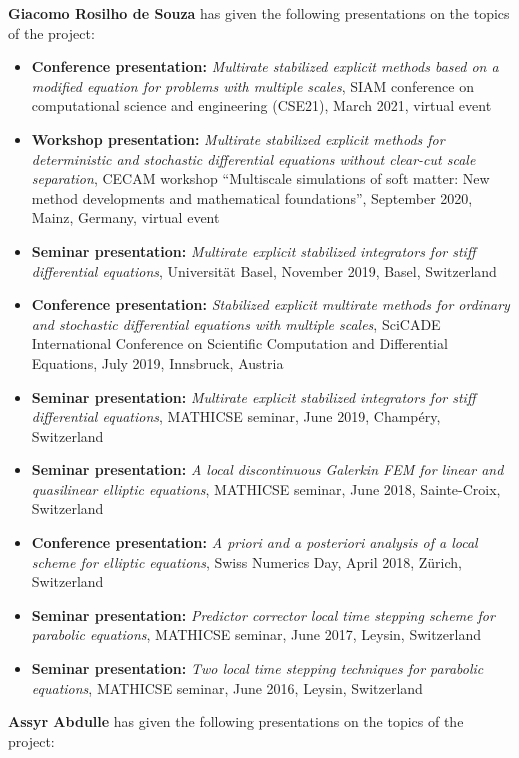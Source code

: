 \documentclass[10pt]{article}
\begin{document}
%
\textbf{Giacomo Rosilho de Souza} has given the following presentations on the topics of the project:
\begin{itemize}
	\item \textbf{Conference presentation:} \textit{Multirate stabilized explicit methods based on a modified equation for problems with multiple scales}, SIAM conference on computational science and engineering (CSE21), March 2021, virtual event
	\item \textbf{Workshop presentation:} \textit{Multirate stabilized explicit methods for deterministic and stochastic differential equations without clear-cut scale separation}, CECAM workshop ``Multiscale simulations of soft matter: New method developments and mathematical foundations'', September 2020, Mainz, Germany, virtual event 
	\item \textbf{Seminar presentation:} \textit{Multirate explicit stabilized integrators for stiff differential equations}, Universität Basel, November 2019, Basel, Switzerland
	\item \textbf{Conference presentation:} \textit{Stabilized explicit multirate methods for ordinary and stochastic differential equations with multiple scales}, SciCADE International Conference on Scientific Computation and Differential Equations, July 2019, Innsbruck, Austria
	\item \textbf{Seminar presentation:} \textit{Multirate explicit stabilized integrators for stiff differential equations}, MATHICSE seminar, June 2019, Champéry, Switzerland
	\item \textbf{Seminar presentation:} \textit{A local discontinuous Galerkin FEM for linear and quasilinear elliptic equations}, MATHICSE seminar, June 2018, Sainte-Croix, Switzerland
	\item \textbf{Conference presentation:} \textit{A priori and a posteriori analysis of a local scheme for elliptic equations}, Swiss Numerics Day, April 2018, Zürich, Switzerland
	\item \textbf{Seminar presentation:} \textit{Predictor corrector local time stepping scheme for parabolic equations}, MATHICSE seminar, June 2017, Leysin, Switzerland
	\item \textbf{Seminar presentation:} \textit{Two local time stepping techniques for parabolic equations}, MATHICSE seminar, June 2016, Leysin, Switzerland
\end{itemize}
%
\textbf{Assyr Abdulle} has given the following presentations on the topics of the project:
\end{document}
